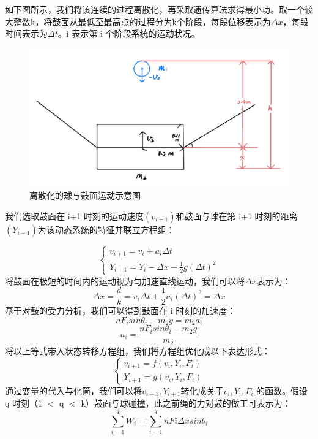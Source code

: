\documentclass[withoutpreface,bwprint]{cumcmthesis}
\begin{document}
如下图所示，我们将该连续的过程离散化，再采取遗传算法求得最小功。取一个较大整数k，将鼓面从最低至最高点的过程分为k个阶段，每段位移表示为$\Delta x$，每段时间表示为$\Delta t$。i 表示第 i 个阶段系统的运动状况。

\begin{figure}[H]
	\centering
	\includegraphics[scale = 0.20]{IMG_0014.jpg}
	\caption{离散化的球与鼓面运动示意图}
\end{figure}

我们选取鼓面在 i+1 时刻的运动速度$\left(v_{i+1}\right)$和鼓面与球在第 i+1 时刻的距离 $\left(Y_{i+1}\right)$为该动态系统的特征并联立方程组：

\begin{equation}
	\begin{cases}
		v_{i+1} = v_i + a_i \Delta t\\
		Y_{i+1} = Y_i - \Delta x - \frac{1}{2}g\left(\Delta t\right)^2
	\end{cases}
\end{equation}
将鼓面在极短的时间内的运动视为匀加速直线运动，我们可以将$\Delta x$表示为：
\[\Delta x = \frac{d}{k} = v_i\Delta t + \frac{1}{2}a_i\left(\Delta t\right)^2 = \Delta x\]
基于对鼓的受力分析，我们可以得到鼓面在 i 时刻的加速度：
\[nF_i sin\theta_i - m_2g = m_2a_i\]
\[a_i = \frac{nF_i sin\theta_i - m_2g}{m_2}\]
将以上等式带入状态转移方程组，我们将方程组优化成以下表达形式：
\begin{equation}
	\begin{cases}
		v_{i+1} = f\left(v_i, Y_i, F_i\right)\\
		Y_{i+1} = g\left(v_i, Y_i, F_i\right)
	\end{cases}
\end{equation}
通过变量的代入与化简，我们可以将$v_{i+1}, Y_{i+1}$转化成关于$v_i, Y_i, F_i$ 的函数。假设 q 时刻（1 $<$ q $<$ k）鼓面与球碰撞，此之前绳的力对鼓的做工可表示为：
\[\sum_{i = 1}^qW_i = \sum_{i = 1}^qnFi\Delta x sin\theta_i\]
\end{document}
